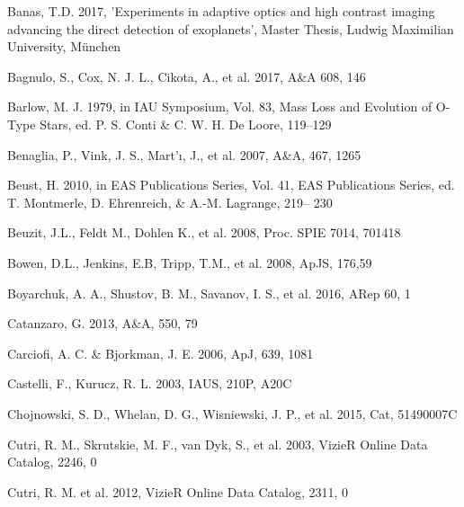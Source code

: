 \documentclass[tradiabstract]{aa} %
\begin{document}



\begin{thebibliography}{}


\item[] Banas, T.D. 2017, 'Experiments in adaptive optics and high contrast
imaging advancing the direct detection of exoplanets', Master Thesis,
Ludwig Maximilian University, M\"unchen

\item[] Bagnulo, S., Cox, N. J. L., Cikota, A., et al. 2017, A\&A 608, 146

\item[] Barlow, M. J. 1979, in IAU Symposium, Vol. 83, Mass Loss and
Evolution of O-Type Stars, ed. P. S. Conti \& C. W. H. De Loore,
119–129

\item[] Benaglia, P., Vink, J. S., Mart'ı, J., et al. 2007, A\&A, 467, 1265

\item[] Beust, H. 2010, in EAS Publications Series, Vol. 41, EAS Publications
Series, ed. T. Montmerle, D. Ehrenreich, \& A.-M. Lagrange, 219–
230

\item[] Beuzit, J.L., Feldt M., Dohlen K., et al. 2008, Proc. SPIE 7014, 701418

\item[] Bowen, D.L., Jenkins, E.B, Tripp, T.M., et al. 2008, ApJS, 176,59


\item[] Boyarchuk, A. A., Shustov, B. M., Savanov, I. S., et al. 2016, ARep 60, 1

\item[] Catanzaro, G. 2013, A\&A, 550, 79

\item[] Carciofi, A. C. \& Bjorkman, J. E.  2006, ApJ, 639, 1081

\item[] Castelli, F., Kurucz, R. L. 2003, IAUS, 210P, A20C

\item[] Chojnowski, S. D., Whelan, D. G., Wisniewski, J. P., et
  al. 2015, Cat, 51490007C

\item[] Cutri, R. M., Skrutskie, M. F., van Dyk, S., et al. 2003, VizieR Online
Data Catalog, 2246, 0

\item[] Cutri, R. M. et al. 2012, VizieR Online Data Catalog, 2311, 0


\end{thebibliography}
\end{document}
